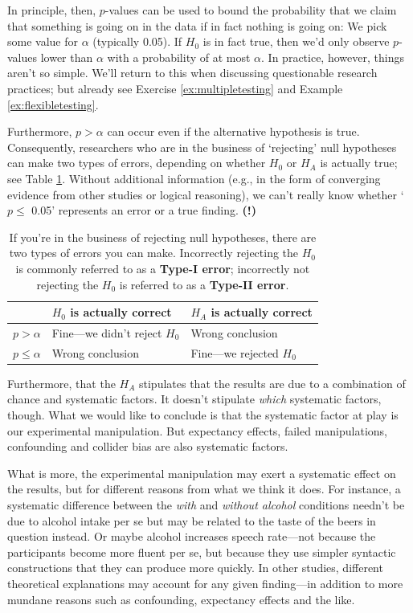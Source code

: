 \documentclass[a4paper]{tufte-book}\usepackage[]{graphicx}\usepackage[]{xcolor}
\begin{document}
In principle, then, $p$-values can be used to bound the probability 
that we claim that something is going on in the data if in fact nothing is going on:
We pick some value for $\alpha$ (typically 0.05).
If $H_0$ is in fact true, then we'd only observe $p$-values lower than
$\alpha$ with a probability of at most $\alpha$.
In practice, however, things aren't so simple.
We'll return to this when discussing questionable research practices;
but already see Exercise \ref{ex:multipletesting} 
and Example \ref{ex:flexibletesting}.

Furthermore, $p>\alpha$ can occur even
if the alternative hypothesis is true.
Consequently,
researchers who are in the business of `rejecting' null hypotheses
can make two types of errors, depending on whether $H_0$ or $H_A$ is actually true;
see Table \ref{tab:errors}.
Without additional information (e.g., in the form of converging evidence
from other studies or logical reasoning), we can't really know whether
`$p \leq$ 0.05' represents an error or a true finding. \textbf{(!)}

\begin{table}[h]
\caption{If you're in the business of rejecting null hypotheses, there are two types of errors you can make.
Incorrectly rejecting the $H_0$ is commonly referred to as a \textbf{Type-I error};
incorrectly not rejecting the $H_0$ is referred to as a \textbf{Type-II error}.}
\centering
\begin{tabular}{@{}lll@{}}
\toprule
                            & $H_0$ is actually correct       & $H_A$ is actually correct \\ \midrule
$p > \alpha$                  & Fine---we didn't reject $H_0$   & Wrong conclusion  \\
$p \leq \alpha$               & Wrong conclusion                & Fine---we rejected $H_0$ \\
\bottomrule
\end{tabular}
\label{tab:errors}
\end{table}

\medskip

Furthermore, that the $H_A$ stipulates that the results are
due to a combination of chance and systematic factors.
It doesn't stipulate \emph{which} systematic factors, though.
What we would like to conclude is that the systematic factor
at play is our experimental manipulation.
But expectancy effects, failed manipulations, confounding and collider bias
are also systematic factors.

What is more, the experimental manipulation may exert a systematic
effect on the results, but for different reasons from what we think it does.
For instance, a systematic difference between the
\textit{with} and \textit{without alcohol} conditions needn't be due to alcohol intake per se but
may be related to the taste of the beers in question instead.
Or maybe alcohol increases speech rate---not because the participants
become more fluent per se, but because they use simpler syntactic
constructions that they can produce more quickly.
In other studies, different theoretical explanations 
may account for any given finding---in addition to more mundane reasons such as confounding, expectancy effects and the like.
\end{document}
